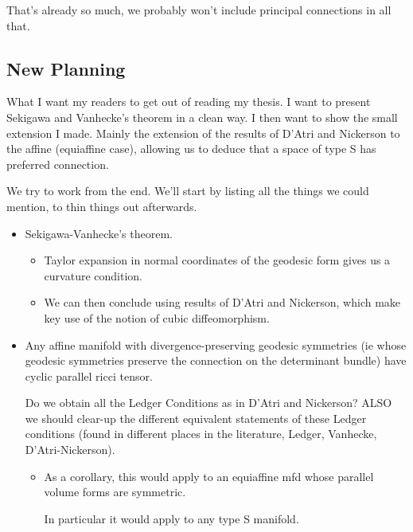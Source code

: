 \documentclass{report}
\theoremstyle{definition}
\begin{document}
That's already so much, we probably won't include principal connections in all that.

\subsection{New Planning}

What I want my readers to get out of reading my thesis. I want to present Sekigawa and Vanhecke's theorem in a clean way. I then want to show the small extension I made. Mainly the extension of the results of D'Atri and Nickerson to the affine (equiaffine case), allowing us to deduce that a space of type S has preferred connection.

We try to work from the end. We'll start by listing all the things we could mention, to thin things out afterwards.
\begin{itemize}
    \item Sekigawa-Vanhecke's theorem.
    \begin{itemize}
        \item Taylor expansion in normal coordinates of the geodesic form gives us a curvature condition.
        \item We can then conclude using results of D'Atri and Nickerson, which make key use of the notion of cubic diffeomorphism.
    \end{itemize}
    \item Any affine manifold with divergence-preserving geodesic symmetries (ie whose geodesic symmetries preserve the connection on the determinant bundle) have cyclic parallel ricci tensor.

    Do we obtain all the Ledger Conditions as in D'Atri and Nickerson? ALSO we should clear-up the different equivalent statements of these Ledger conditions (found in different places in the literature, Ledger, Vanhecke, D'Atri-Nickerson).
    \begin{itemize}
        \item As a corollary, this would apply to an equiaffine mfd whose parallel volume forms are symmetric.

        In particular it would apply to any type S manifold.
    \end{itemize}
\end{itemize}
\end{document}
